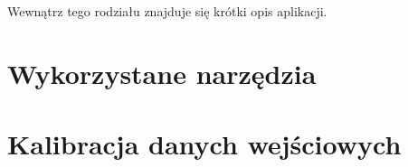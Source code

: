 Wewnątrz tego rodziału znajduje się krótki opis aplikacji.
\section{Wykorzystane narzędzia}
\section{Kalibracja danych wejściowych}
\label{sec:calibration}

